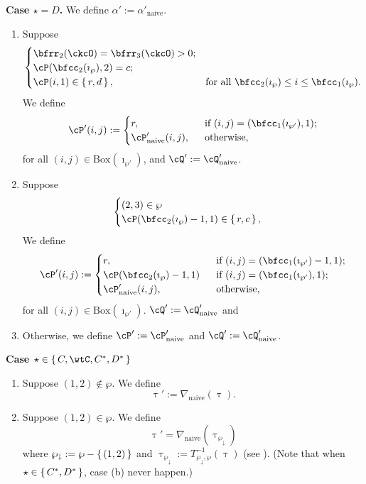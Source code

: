 \documentclass[12pt,a4paper]{amsart}
\def\tnaive{\mathrm{naive}}
\def\wpm{\wp_{\downarrow}}
\def\alphapn{\alpha'_{\tnaive}}
\def\DDn{\nabla_{\tnaive}}
\numberwithin{equation}{section}
\theoremstyle{remark}
\newcommand{\BOX}[1]{\mathrm{Box}(#1)}
\def\AND{\quad \text{and} \quad}
\def\imathwpp{\imath_{\wp'}}
\def\cPpn{\cP'_\mathrm{naive}}
\def\cQpn{\cQ'_\mathrm{naive}}
\begin{document}
{\bfseries Case $\star = D$. }
We define $\alpha' := \alphapn$.
\begin{enumerate}[label=(\alph*)]
  \item  Suppose
  \[
    \begin{cases}
      \bfrr_2(\ckcO)=\bfrr_{3}(\ckcO)>0; & \\
      \cP(\bfcc_{2}(\imath_{\wp}),2) = c;  &\\
      \cP(i,1)\in \set{r,d}, & \text{for all
        $\bfcc_{2}(\imath_{\wp})\leq i\leq \bfcc_{1}(\imath_{\wp})$}.
    \end{cases}
  \]
  We define %
  \[
    \cP'(i,j) := \begin{cases}
      r, & \ \text{ if $(i,j) = (\bfcc_1(\imathwpp),1)$;}\\
      \cPpn(i,j), & \ \text{ otherwise},
    \end{cases}
  \] for all $(i,j)\in \BOX{\imathwpp}$, and
  $\cQ' := \cQpn $.
  \item Suppose
  \[
    \begin{cases}
      (2,3)\in \wp & \\
      \cP(\bfcc_2(\imath_{\wp})-1,1)\in \set{r,c},
    \end{cases}
  \]
  We define
  \[
    \cP'(i,j) := \begin{cases}
      r, & \ \text{ if $(i,j) = (\bfcc_1(\imathwpp)-1,1)$;}\\
      \cP(\bfcc_2(\imath_{\wp})-1,1) & \ \text{ if $(i,j) = (\bfcc_1(\imathwpp),1)$;}\\
      \cPpn(i,j), & \ \text{ otherwise},
    \end{cases}
  \] for all $(i,j)\in \BOX{\imathwpp}$.
  $\cQ' := \cQpn $ and
  \item Otherwise, we define $\cP' := \cPpn$ and $\cQ':= \cQpn$.
\end{enumerate}

{\bfseries Case $\star \in \set{C,\wtC,C^{*},D^{*}}$}

\begin{enumerate}[label=(\alph*)]
  \item Suppose $(1,2)\notin \wp$. We define
  \[
    \uptau' := \DDn(\uptau).
  \]
  \item Suppose $(1,2)\in \wp$. We define
  \[
  \uptau' = \DDn(\uptau_{\wpm})
  \]
  where $\wpm := \wp - \set{(1,2)}$ and
  $\uptau_{\wpm}  := T_{\wpm,\wp}^{-1}(\uptau)$ (see ).
        (Note that when $\star \in \set{C^{*},D^{*}}$, case (b) never happen.)
\end{enumerate}
\end{document}
